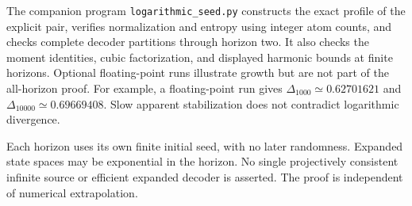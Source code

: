\documentclass[11pt,a4paper]{article}
\begin{document}
The companion program \texttt{logarithmic\_seed.py} constructs the exact
profile of the explicit pair, verifies normalization and entropy using
integer atom counts, and checks complete decoder partitions through
horizon two. It also checks the moment identities, cubic factorization,
and displayed harmonic bounds at finite horizons. Optional floating-point
runs illustrate growth but are not part of the all-horizon proof.
For example, a floating-point run gives
$\Delta_{1000}\simeq0.62701621$ and
$\Delta_{10000}\simeq0.69669408$.
Slow apparent stabilization does not contradict logarithmic divergence.

Each horizon uses its own finite initial seed, with no later randomness.
Expanded state spaces may be exponential in the horizon. No single
projectively consistent infinite source or efficient expanded decoder is
asserted. The proof is independent of numerical extrapolation.
\end{document}
